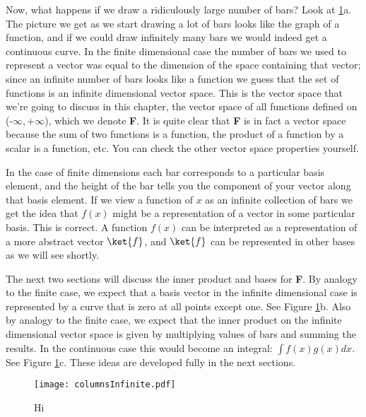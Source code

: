 Now, what happens if we draw a ridiculously large number of bars?  Look at \ref{Fig:columnsInfinite}a.  The picture we get as we start drawing a lot of bars looks like the graph of a function, and if we could draw infinitely many bars we would indeed get a continuous curve.  In the finite dimensional case the number of bars we used to represent a vector was equal to the dimension of the space containing that vector; since an infinite number of bars looks like a function we guess that the set of functions is an infinite dimensional vector space.  This is the vector space that we're going to discuss in this chapter, the vector space of all functions defined on (-$\infty,+\infty$), which we denote \textbf{F}.  It is quite clear that \textbf{F} is in fact a vector space because the sum of two functions is a function, the product of a function by a scalar is a function, etc.  You can check the other vector space properties yourself.

In the case of finite dimensions each bar corresponds to a particular basis element, and the height of the bar tells you the component of your vector along that basis element. If we view a function of $x$ as an infinite collection of bars we get the idea that $f(x)$ might be a representation of a vector in some particular basis. This is correct. A function $f(x)$ can be interpreted as a representation of a more abstract vector $\ket{f}$, and $\ket{f}$ can be represented in other bases as we will see shortly.

The next two sections will discuss the inner product and bases for \textbf{F}. By analogy to the finite case, we expect that a basis vector in the infinite dimensional case is represented by a curve that is zero at all points except one. See Figure \ref{Fig:columnsInfinite}b. Also by analogy to the finite case, we expect that the inner product on the infinite dimensional vector space is given by multiplying values of bars and summing the results. In the continuous case this would become an integral: $\int f(x)g(x)dx$. See Figure \ref{Fig:columnsInfinite}c. These ideas are developed fully in the next sections.

\begin{figure}
\begin{centering}
\texttt{[image: columnsInfinite.pdf]}
\par\end{centering}
\caption{Hi}
\label{Fig:columnsInfinite}
\end{figure}

